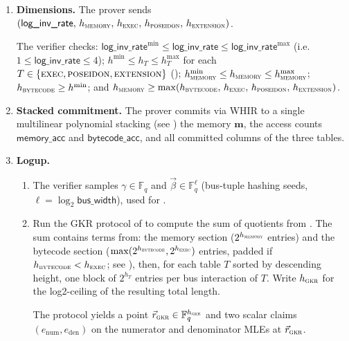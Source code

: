 \documentclass{article}
\theoremstyle{definition}
\newcommand{\Fq}{\mathbb F_q}
\begin{document}
\begin{enumerate}
    \item \textbf{Dimensions.} 
    The prover sends $(\textsf{log\_inv\_rate},\, h_\textsc{memory},\, h_\textsc{exec},\, h_\textsc{poseidon},\, h_\textsc{extension})$.
    
    The verifier checks: $\textsf{log\_inv\_rate}^{\min} \leq \textsf{log\_inv\_rate} \leq \textsf{log\_inv\_rate}^{\max}$ (i.e.\ $1 \leq \textsf{log\_inv\_rate} \leq 4$); $h^{\min} \leq h_T \leq h_T^{\max}$ for each $T \in \{\textsc{exec}, \textsc{poseidon}, \textsc{extension}\}$ (); $h_\textsc{memory}^{\min} \leq h_\textsc{memory} \leq h_\textsc{memory}^{\max}$; $h_\textsc{bytecode} \geq h^{\min}$; and $h_\textsc{memory} \geq \max(h_\textsc{bytecode},\, h_\textsc{exec},\, h_\textsc{poseidon},\, h_\textsc{extension})$.

    \item \textbf{Stacked commitment.} The prover commits via WHIR \cite{whir} to a single multilinear polynomial stacking (see ) the memory $\textbf{m}$, the access counts $\textsf{memory\_acc}$ and $\textsf{bytecode\_acc}$, and all committed columns of the three tables.

    \item \textbf{Logup.}
    \begin{enumerate}
        \item  The verifier samples $\gamma \in \Fq$ and $\vec\beta \in \Fq^{\ell}$ (bus-tuple hashing seeds, $\ell = \log_2 \textsf{bus\_width}$), used for .
        \item  Run the GKR protocol of  to compute the sum of quotients from . The sum contains terms from: the memory section ($2^{h_\textsc{memory}}$ entries) and the bytecode section ($\max(2^{h_\textsc{bytecode}}, 2^{h_\textsc{exec}})$ entries, padded if $h_\textsc{bytecode} < h_\textsc{exec}$; see ), then, for each table $T$ sorted by descending height, one block of $2^{h_T}$ entries per bus interaction of $T$. Write $h_\textsc{gkr}$ for the log2-ceiling of the resulting total length.

        The protocol yields a point $\vec r_\textsc{gkr} \in \Fq^{h_\textsc{gkr}}$ and two scalar claims $(e_\text{num}, e_\text{den})$ on the numerator and denominator MLEs at $\vec r_\textsc{gkr}$.


\end{enumerate}
\end{enumerate}
\end{document}
